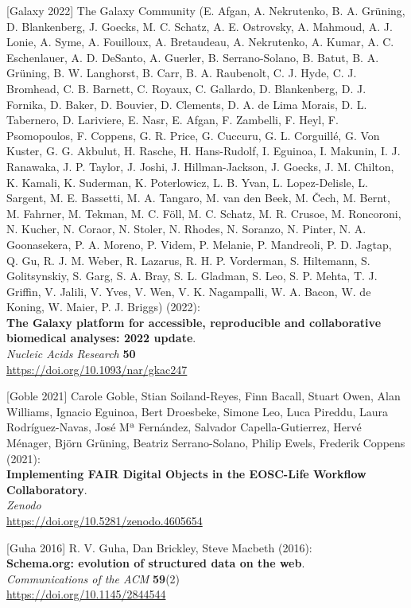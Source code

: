 {[}Galaxy 2022{]} The Galaxy Community (E. Afgan, A. Nekrutenko, B. A.
Grüning, D. Blankenberg, J. Goecks, M. C. Schatz, A. E. Ostrovsky, A.
Mahmoud, A. J. Lonie, A. Syme, A. Fouilloux, A. Bretaudeau, A.
Nekrutenko, A. Kumar, A. C. Eschenlauer, A. D. DeSanto, A. Guerler, B.
Serrano-Solano, B. Batut, B. A. Grüning, B. W. Langhorst, B. Carr, B. A.
Raubenolt, C. J. Hyde, C. J. Bromhead, C. B. Barnett, C. Royaux, C.
Gallardo, D. Blankenberg, D. J. Fornika, D. Baker, D. Bouvier, D.
Clements, D. A. de Lima Morais, D. L. Tabernero, D. Lariviere, E. Nasr,
E. Afgan, F. Zambelli, F. Heyl, F. Psomopoulos, F. Coppens, G. R. Price,
G. Cuccuru, G. L. Corguillé, G. Von Kuster, G. G. Akbulut, H. Rasche, H.
Hans-Rudolf, I. Eguinoa, I. Makunin, I. J. Ranawaka, J. P. Taylor, J.
Joshi, J. Hillman-Jackson, J. Goecks, J. M. Chilton, K. Kamali, K.
Suderman, K. Poterlowicz, L. B. Yvan, L. Lopez-Delisle, L. Sargent, M.
E. Bassetti, M. A. Tangaro, M. van den Beek, M. Čech, M. Bernt, M.
Fahrner, M. Tekman, M. C. Föll, M. C. Schatz, M. R. Crusoe, M.
Roncoroni, N. Kucher, N. Coraor, N. Stoler, N. Rhodes, N. Soranzo, N.
Pinter, N. A. Goonasekera, P. A. Moreno, P. Videm, P. Melanie, P.
Mandreoli, P. D. Jagtap, Q. Gu, R. J. M. Weber, R. Lazarus, R. H. P.
Vorderman, S. Hiltemann, S. Golitsynskiy, S. Garg, S. A. Bray, S. L.
Gladman, S. Leo, S. P. Mehta, T. J. Griffin, V. Jalili, V. Yves, V. Wen,
V. K. Nagampalli, W. A. Bacon, W. de Koning, W. Maier, P. J. Briggs)
(2022):\\
\textbf{The Galaxy platform for accessible, reproducible and
collaborative biomedical analyses: 2022 update}.\\
\emph{Nucleic Acids Research} \textbf{50}\\
\url{https://doi.org/10.1093/nar/gkac247}

{[}Goble 2021{]} Carole Goble, Stian Soiland-Reyes, Finn Bacall, Stuart
Owen, Alan Williams, Ignacio Eguinoa, Bert Droesbeke, Simone Leo, Luca
Pireddu, Laura Rodríguez-Navas, José Mª Fernández, Salvador
Capella-Gutierrez, Hervé Ménager, Björn Grüning, Beatriz Serrano-Solano,
Philip Ewels, Frederik Coppens (2021):\\
\textbf{Implementing FAIR Digital Objects in the EOSC-Life Workflow
Collaboratory}.\\
\emph{Zenodo}\\
\url{https://doi.org/10.5281/zenodo.4605654}

{[}Guha 2016{]} R. V. Guha, Dan Brickley, Steve Macbeth (2016):\\
\textbf{Schema.org: evolution of structured data on the web}.\\
\emph{Communications of the ACM} \textbf{59}(2)\\
\url{https://doi.org/10.1145/2844544}

